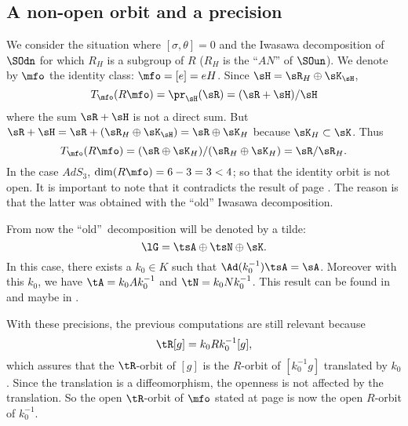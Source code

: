 \subsection{A non-open orbit and a precision}\label{subsec:precision}

We consider the situation where $[\sigma,\theta]=0$ and the Iwasawa decomposition of $\SOdn$ for which $R_H$ is a subgroup of $R$ ($R_H$ is the ``$AN$''{} of $\SOun$). We denote by $\mfo$ the identity class: $\mfo=[e]=eH$. Since $\sH=\sR_H\oplus\sK_{\sH}$,
\[
   T_{\mfo}(R\mfo)=\pr_{\sH}(\sR)=(\sR+\sH)/\sH
\]
where the sum $\sR+\sH$ is not a direct sum. But $\sR+\sH=\sR+(\sR_H\oplus\sK_{\sH})=\sR\oplus\sK_H$ because $\sK_H\subset\sK$. Thus
\[
   T_{\mfo}(R\mfo)=(\sR\oplus\sK_H)/(\sR_H\oplus\sK_H)=\sR/\sR_H.
\]
\label{pg:subt_tilde}In the case $AdS_3$, $\dim(R\mfo)=6-3=3<4$; so that the identity orbit is not open. It is important to note that it contradicts the result of page \pageref{pg:mfo_ouvert}. The reason is that the latter was obtained with the ``old''{} Iwasawa decomposition.

From now the ``old''\ decomposition will be denoted by a tilde:
\[
\lG=\tsA\oplus\tsN\oplus\sK.
\]
In this case, there exists a $k_0\in K$ such that $\Ad(k_0^{-1})\tsA=\sA$.  Moreover with this $k_0$, we have $\tA=k_0Ak_0^{-1}$ and $\tN=k_0Nk_0^{-1}$. This result can be found in \cite{Helgason} and maybe in \cite{Wisser}.

With these precisions, the previous computations are still relevant because
\begin{equation}
   \tR[g]=k_0Rk_0^{-1}[g],
\end{equation}
which assures that the $\tR$-orbit of $[g]$ is the $R$-orbit of $[k_0^{-1} g]$ translated by
$k_0$. Since the translation is a diffeomorphism, the openness is not affected by the
translation. So the open $\tR$-orbit of $\mfo$ stated at page
\pageref{pg:mfo_ouvert} is now the open $R$-orbit of $k_0^{-1}$.

